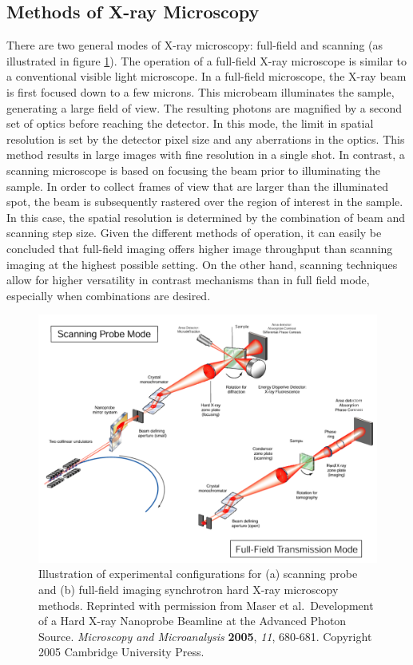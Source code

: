 \documentclass[journal=cmatex,manuscript=perspective]{achemso}
\begin{document}
\subsection{Methods of X-ray Microscopy}

There are two general modes of X-ray microscopy: full-field and
scanning (as illustrated in figure \ref{figure:maser2005}). The
operation of a full-field X-ray microscope is similar to a
conventional visible light microscope. In a full-field microscope, the
X-ray beam is first focused down to a few microns. This microbeam
illuminates the sample, generating a large field of view. The
resulting photons are magnified by a second set of optics before
reaching the detector.  In this mode, the limit in spatial resolution
is set by the detector pixel size and any aberrations in the
optics. This method results in large images with fine resolution in a
single shot. In contrast, a scanning microscope is based on focusing
the beam prior to illuminating the sample.  In order to collect frames
of view that are larger than the illuminated spot, the beam is
subsequently rastered over the region of interest in the sample. In
this case, the spatial resolution is determined by the combination of
beam and scanning step size. Given the different methods of operation,
it can easily be concluded that full-field imaging offers higher image
throughput than scanning imaging at the highest possible setting. On
the other hand, scanning techniques allow for higher versatility in
contrast mechanisms than in full field mode, especially when
combinations are desired.

\begin{figure}
  \includegraphics[width=\textwidth]{maser2005.png}
  \caption{Illustration of experimental configurations for (a)
    scanning probe and (b) full-field imaging synchrotron hard X-ray
    microscopy methods. Reprinted with permission from Maser et
    al.\ Development of a Hard X-ray Nanoprobe Beamline at the Advanced
    Photon Source. \textit{Microscopy and Microanalysis}
    \textbf{2005}, \textit{11}, 680-681. Copyright 2005 Cambridge
    University Press.}
  \label{figure:maser2005}
\end{figure}
\end{document}
